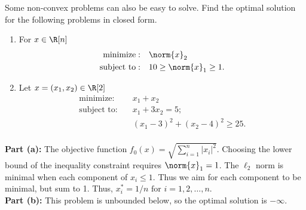 \documentclass[11pt]{article}
\DeclareMathOperator{\minimize}{minimize:}
\DeclareMathOperator{\subjectto}{subject\ to:}
\begin{document}
\begin{homeworkProblem}
    Some non-convex problems can also be easy to solve. Find the optimal solution for the
    following problems in closed form.
    \begin{enumerate}[label=(\alph*), topsep=5pt, itemsep=5pt]
        \item For $x \in \R[n]$
              \begin{align*}
                  \minimize  & \quad  \norm{x}_2                 \\
                  \subjectto & \quad  10 \geq \norm{x}_1 \geq 1.
              \end{align*}
        \item Let $x = (x_1, x_2) \in \R[2]$
              \begin{align*}
                  \minimize  & \quad  x_1 + x_2                          \\
                  \subjectto & \quad  x_1 + 3x_2 = 5;                    \\
                             & \quad  (x_1 - 3)^2 + (x_2 - 4)^2 \geq 25. \\
              \end{align*}
    \end{enumerate}

    \solution

    \textbf{Part (a):} The objective function $f_0(x) = \sqrt{\sum_{i=1}^{n} |x_i|^2}$.
    Choosing the lower bound of the inequality constraint requires $\norm{x}_1 = 1$.
    The $\ell_2$ norm is minimal when each component of $x_i \leq 1$. Thus we aim for
    each component to be minimal, but sum to 1. Thus, $x_i^* = 1/n \text{ for } i = 1, 2, \dots, n$.\\

    \textbf{Part (b):} This problem is unbounded below, so the optimal solution is $-\infty$.

\end{homeworkProblem}

\pagebreak
\end{document}
